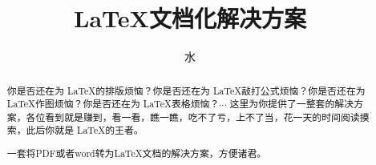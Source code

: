 \documentclass{mylatex}
\title{\LaTeX 文档化解决方案}
\author{水}
\begin{document}
\maketitle

\begin{abstract}
	
	你是否还在为 \LaTeX 的排版烦恼？你是否还在为 \LaTeX 敲打公式烦恼？你是否还在为 \LaTeX 作图烦恼？你是否还在为  \LaTeX 表格烦恼？$ \cdots $
	这里为你提供了一整套的解决方案，各位看到就是赚到，看一看，瞧一瞧，吃不了亏，上不了当，花一天的时间阅读摸索，此后你就是 \LaTeX 的王者。
	
	
	一套将PDF或者word转为\LaTeX 文档的解决方案，方便诸君。
\end{abstract}


\tableofcontents











\end{document}
